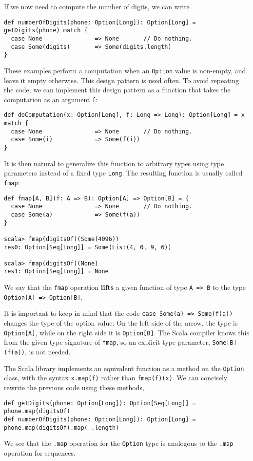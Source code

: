 If we now need to compute the number of digits, we can write
\begin{lstlisting}
def numberOfDigits(phone: Option[Long]): Option[Long] = getDigits(phone) match {
  case None               => None       // Do nothing.
  case Some(digits)       => Some(digits.length)
}
\end{lstlisting}

These examples perform a computation when an \lstinline!Option! value
is non-empty, and leave it empty otherwise. This design pattern is
used often. To avoid repeating the code, we can implement this design
pattern as a function that takes the computation as an argument \lstinline!f!:
\begin{lstlisting}
def doComputation(x: Option[Long], f: Long => Long): Option[Long] = x match {
  case None               => None       // Do nothing.
  case Some(i)            => Some(f(i))
}
\end{lstlisting}
It is then natural to generalize this function to arbitrary types
using type parameters instead of a fixed type \lstinline!Long!. The
resulting function is usually called \lstinline!fmap!:
\begin{lstlisting}
def fmap[A, B](f: A => B): Option[A] => Option[B] = {
  case None               => None       // Do nothing.
  case Some(a)            => Some(f(a))
}

scala> fmap(digitsOf)(Some(4096))
res0: Option[Seq[Long]] = Some(List(4, 0, 9, 6))

scala> fmap(digitsOf)(None)
res1: Option[Seq[Long]] = None
\end{lstlisting}
We say that the \lstinline!fmap! operation \textbf{lifts}
a given function of type \lstinline!A => B! to the type \lstinline!Option[A] => Option[B]!. 

It is important to keep in mind that the code \lstinline!case Some(a) => Some(f(a))!
changes the type of the option value. On the left side of the arrow,
the type is \lstinline!Option[A]!, while on the right side it is
\lstinline!Option[B]!. The Scala compiler knows this from the given
type signature of \lstinline!fmap!, so an explicit type parameter,
\lstinline!Some[B](f(a))!, is not needed.

The Scala library implements an equivalent function as a method on
the \lstinline!Option! class, with the syntax \lstinline!x.map(f)!
rather than \lstinline!fmap(f)(x)!. We can concisely rewrite the
previous code using these methods,
\begin{lstlisting}
def getDigits(phone: Option[Long]): Option[Seq[Long]] = phone.map(digitsOf)
def numberOfDigits(phone: Option[Long]): Option[Long] = phone.map(digitsOf).map(_.length)
\end{lstlisting}
We see that the \lstinline!.map! operation for the \lstinline!Option!
type is analogous to the \lstinline!.map! operation for sequences. 

